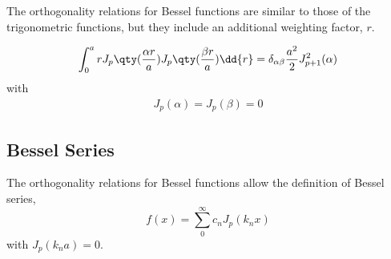 The orthogonality relations for Bessel functions are similar to those
of the trigonometric functions, but they include an additional weighting factor, $r$.

\begin{equation}
  \label{eq:orthogbess}
  \int_0^a r J_p \qty( \frac{\alpha r}{a} ) J_p \qty(\frac{\beta r}{a}) \dd{r} = \delta_{\alpha \beta} \frac{a^2}{2} J_{p+1}^2(\alpha)
\end{equation}
with
\begin{align*}
  J_p(\alpha) = J_p(\beta) = 0
\end{align*}

\subsection{Bessel Series}
\label{sec:besselseries}

The orthogonality relations for Bessel functions allow the definition of Bessel series,
\begin{equation}
  \label{eq:besselser}
  f(x) = \sum_0^{\infty} c_n J_p(k_n x)
\end{equation}
with $J_p(k_na)=0$.

